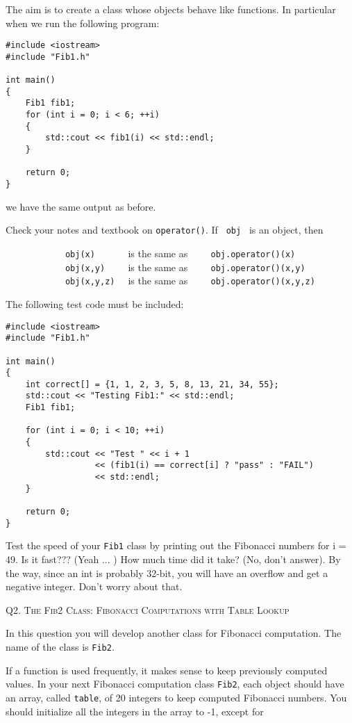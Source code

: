 The aim is to create a class whose objects behave like functions. In particular when we run the
following program:

\begin{Verbatim}[frame=single]
#include <iostream>
#include "Fib1.h"

int main()
{
    Fib1 fib1;
    for (int i = 0; i < 6; ++i)
    {
        std::cout << fib1(i) << std::endl;
    }

    return 0;
}
\end{Verbatim}
we have the same output as before.

Check your notes and textbook on \verb!operator()!. If \verb! obj ! is an
object, then

\verb!            obj(x)      ! is the same as \verb!    obj.operator()(x)!
\\
\verb!            obj(x,y)    ! is the same as \verb!    obj.operator()(x,y)!
\\
\verb!            obj(x,y,z)  ! is the same as \verb!    obj.operator()(x,y,z)!


The following test code must be included:

\begin{Verbatim}[frame=single]
#include <iostream>
#include "Fib1.h"

int main()
{
    int correct[] = {1, 1, 2, 3, 5, 8, 13, 21, 34, 55};
    std::cout << "Testing Fib1:" << std::endl;
    Fib1 fib1;

    for (int i = 0; i < 10; ++i)
    {
        std::cout << "Test " << i + 1
                  << (fib1(i) == correct[i] ? "pass" : "FAIL")
                  << std::endl;
    }
      
    return 0;
}
\end{Verbatim}

Test the speed of your \texttt{Fib1} class by printing out the Fibonacci numbers for i = 49. Is it fast???
(Yeah ... ) How much time did it take? (No, don't answer). By the way, since an int is probably 32-bit,
you will have an overflow and get a negative integer. Don't worry about that.



\newpage
Q2.
\textsc{The Fib2 Class: Fibonacci Computations with Table Lookup}

In this question you will develop another class for Fibonacci computation. The name of the class is
\texttt{Fib2}.

If a function is used frequently, it makes sense to keep previously computed values. In your next
Fibonacci computation class \texttt{Fib2}, each object should have an array,
called \verb!table!, of 20 integers to
keep computed Fibonacci numbers. You should initialize all the integers in the array to -1, except for

